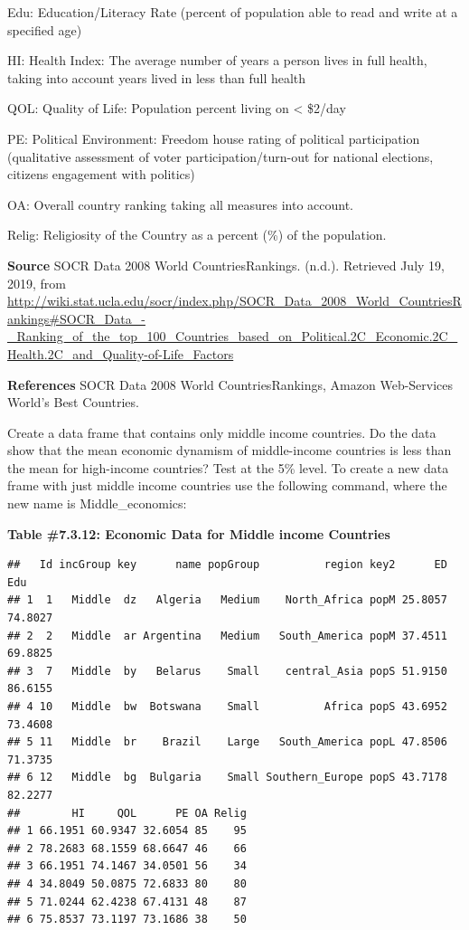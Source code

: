 \documentclass[]{book}
\newenvironment{Shaded}{\begin{snugshade}}{\end{snugshade}}
\newcommand{\KeywordTok}[1]{\textcolor[rgb]{0.13,0.29,0.53}{\textbf{#1}}}
\newcommand{\NormalTok}[1]{#1}
\newcommand{\OperatorTok}[1]{\textcolor[rgb]{0.81,0.36,0.00}{\textbf{#1}}}
\newcommand{\StringTok}[1]{\textcolor[rgb]{0.31,0.60,0.02}{#1}}
\begin{document}
Edu: Education/Literacy Rate (percent of population able to read and write at a specified age)

HI: Health Index: The average number of years a person lives in full health, taking into account years lived in less than full health

QOL: Quality of Life: Population percent living on \textless{} \$2/day

PE: Political Environment: Freedom house rating of political participation (qualitative assessment of voter participation/turn-out for national elections, citizens engagement with politics)

OA: Overall country ranking taking all measures into account.

Relig: Religiosity of the Country as a percent (\%) of the population.

\textbf{Source}
SOCR Data 2008 World CountriesRankings. (n.d.). Retrieved July 19, 2019, from \url{http://wiki.stat.ucla.edu/socr/index.php/SOCR_Data_2008_World_CountriesRankings\#SOCR_Data_-_Ranking_of_the_top_100_Countries_based_on_Political.2C_Economic.2C_Health.2C_and_Quality-of-Life_Factors}

\textbf{References}
SOCR Data 2008 World CountriesRankings, Amazon Web-Services World's Best Countries.

Create a data frame that contains only middle income countries. Do the data show that the mean economic dynamism of middle-income countries is less than the mean for high-income countries? Test at the 5\% level. To create a new data frame with just middle income countries use the following command, where the new name is Middle\_economics:

\textbf{Table \#7.3.12: Economic Data for Middle income Countries}

\begin{Shaded}
\end{Shaded}

\begin{verbatim}
##   Id incGroup key      name popGroup          region key2      ED     Edu
## 1  1   Middle  dz   Algeria   Medium    North_Africa popM 25.8057 74.8027
## 2  2   Middle  ar Argentina   Medium   South_America popM 37.4511 69.8825
## 3  7   Middle  by   Belarus    Small    central_Asia popS 51.9150 86.6155
## 4 10   Middle  bw  Botswana    Small          Africa popS 43.6952 73.4608
## 5 11   Middle  br    Brazil    Large   South_America popL 47.8506 71.3735
## 6 12   Middle  bg  Bulgaria    Small Southern_Europe popS 43.7178 82.2277
##        HI     QOL      PE OA Relig
## 1 66.1951 60.9347 32.6054 85    95
## 2 78.2683 68.1559 68.6647 46    66
## 3 66.1951 74.1467 34.0501 56    34
## 4 34.8049 50.0875 72.6833 80    80
## 5 71.0244 62.4238 67.4131 48    87
## 6 75.8537 73.1197 73.1686 38    50
\end{verbatim}
\end{document}
